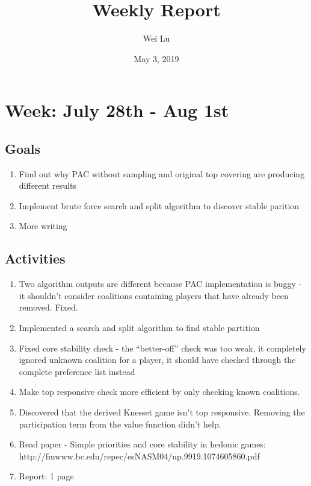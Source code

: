 \documentclass[a4paper]{article}
\title{Weekly Report}
\date{May 3, 2019}
\author{Wei Lu}
\begin{document}
\maketitle

\section*{Week: July 28th - Aug 1st}

\subsection*{Goals}

\begin{enumerate}
  \item Find out why PAC without sampling and original top covering are producing different results
  \item Implement brute force search and split algorithm to discover stable parition
  \item More writing
\end{enumerate}

\subsection*{Activities}

\begin{enumerate}
  \item Two algorithm outputs are different because PAC implementation is buggy - it shouldn't consider coalitions containing players that have already been removed. Fixed.
  \item Implemented a search and split algorithm to find stable partition
  \item Fixed core stability check - the ``better-off'' check was too weak, it completely ignored unknown coalition for a player, it should have checked through the complete preference list instead
  \item Make top responsive check more efficient by only checking known coalitions.
  \item Discovered that the derived Knesset game isn't top responsive. Removing the participation term from the value function didn't help.
  \item Read paper - Simple priorities and core stability in hedonic games: http://fmwww.bc.edu/repec/esNASM04/up.9919.1074605860.pdf
  \item Report: 1 page
\end{enumerate}
\end{document}
